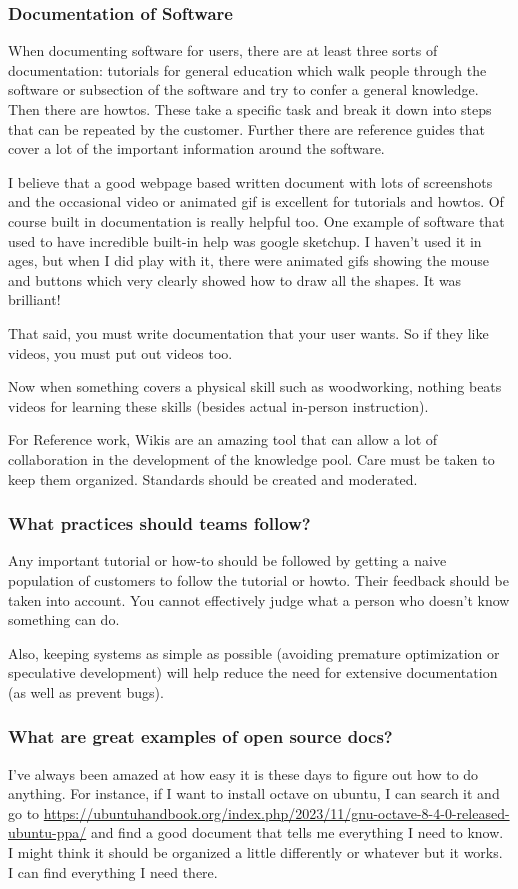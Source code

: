 \documentclass[letter,12pt]{article}
\begin{document}
\subsubsection{Documentation of Software}
When documenting software for users, there are at least three sorts of documentation: tutorials for general education which walk people through the software or subsection of the software and try to confer a general knowledge. Then there are howtos. These take a specific task and break it down into steps that can be repeated by the customer. Further there are reference guides that cover a lot of the important information around the software.

I believe that a good webpage based written document with lots of screenshots and the occasional video or animated gif is excellent for tutorials and howtos. Of course built in documentation is really helpful too. One example of software that used to have incredible built-in help was google sketchup. I haven't used it in ages, but when I did play with it, there were animated gifs showing the mouse and buttons which very clearly showed how to draw all the shapes. It was brilliant!

That said, you must write documentation that your user wants. So if they like videos, you must put out videos too.

Now when something covers a physical skill such as woodworking, nothing beats videos for learning these skills (besides actual in-person instruction).

For Reference work, Wikis are an amazing tool that can allow a lot of collaboration in the development of the knowledge pool. Care must be taken to keep them organized. Standards should be created and moderated.

\subsubsection{What practices should teams follow?}
Any important tutorial or how-to should be followed by getting a naive population of customers to follow the tutorial or howto. Their feedback should be taken into account. You cannot effectively judge what a person who doesn't know something can do.

Also, keeping systems as simple as possible (avoiding premature optimization or speculative development) will help reduce the need for extensive documentation (as well as prevent bugs).

\subsubsection{What are great examples of open source docs?}
I've always been amazed at how easy it is these days to figure out how to do anything. For instance, if I want to install octave on ubuntu, I can search it and go to \href{https://ubuntuhandbook.org/index.php/2023/11/gnu-octave-8-4-0-released-ubuntu-ppa/}{https://ubuntuhandbook.org/index.php/2023/11/gnu-octave-8-4-0-released-ubuntu-ppa/} and find a good document that tells me everything I need to know. I might think it should be organized a little differently or whatever but it works. I can find everything I need there.
\end{document}
